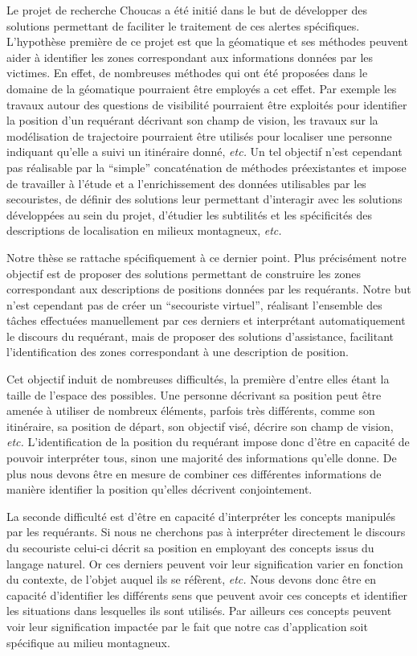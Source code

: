 Le projet de recherche Choucas a été initié dans le but de développer
des solutions permettant de faciliter le traitement de ces alertes
spécifiques. L'hypothèse première de ce projet est que la géomatique
et ses méthodes peuvent aider à identifier les zones correspondant aux
informations données par les victimes. En effet, de nombreuses
méthodes qui ont été proposées dans le domaine de la géomatique
pourraient être employés a cet effet. Par exemple les travaux autour
des questions de visibilité pourraient être exploités pour identifier
la position d'un requérant décrivant son champ de vision, les travaux
sur la modélisation de trajectoire pourraient être utilisés pour
localiser une personne indiquant qu'elle a suivi un itinéraire donné,
\emph{etc.} Un tel objectif n'est cependant pas réalisable par la
\enquote{simple} concaténation de méthodes préexistantes et impose de
travailler à l'étude et a l’enrichissement des données utilisables par
les secouristes, de définir des solutions leur permettant d’interagir
avec les solutions développées au sein du projet, d'étudier les
subtilités et les spécificités des descriptions de localisation en
milieux montagneux, \emph{etc.}

Notre thèse se rattache spécifiquement à ce dernier point. Plus
précisément notre objectif est de proposer des solutions permettant de
construire les zones correspondant aux descriptions de positions
données par les requérants. Notre but n'est cependant pas de créer un
\enquote{secouriste virtuel}, réalisant l'ensemble des tâches
effectuées manuellement par ces derniers et interprétant
automatiquement le discours du requérant, mais de proposer des
solutions d'assistance, facilitant l'identification des zones
correspondant à une description de position.

Cet objectif induit de nombreuses difficultés, la première d'entre
elles étant la taille de l'espace des possibles. Une personne
décrivant sa position peut être amenée à utiliser de nombreux
éléments, parfois très différents, comme son itinéraire, sa position
de départ, son objectif visé, décrire son champ de vision, \emph{etc.}
L'identification de la position du requérant impose donc d'être en
capacité de pouvoir interpréter tous, sinon une majorité des
informations qu'elle donne. De plus nous devons être en mesure de
combiner ces différentes informations de manière identifier la
position qu'elles décrivent conjointement.

La seconde difficulté est d'être en capacité d'interpréter les
concepts manipulés par les requérants. Si nous ne cherchons pas à
interpréter directement le discours du secouriste celui-ci décrit sa
position en employant des concepts issus du langage naturel. Or ces
derniers peuvent voir leur signification varier en fonction du
contexte, de l'objet auquel ils se réfèrent, \emph{etc.}
Nous devons donc être en capacité
d'identifier les différents sens que peuvent avoir ces concepts et
identifier les situations dans lesquelles ils sont utilisés. Par
ailleurs ces concepts peuvent voir leur signification impactée par le
fait que notre cas d’application soit spécifique au milieu montagneux.

